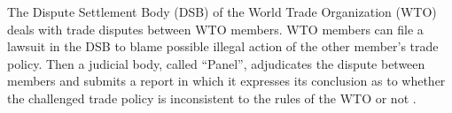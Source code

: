 The Dispute Settlement Body (DSB) of the World Trade Organization (WTO) deals with trade disputes between WTO members.
WTO members can file a lawsuit in the DSB to blame possible illegal action of the other member's trade policy.
Then a judicial body, called ``Panel'', adjudicates the dispute between members and submits a report in which it expresses
its conclusion as to whether the challenged trade policy is inconsistent to the rules of the WTO or not \citep{world2017handbook}.

 

